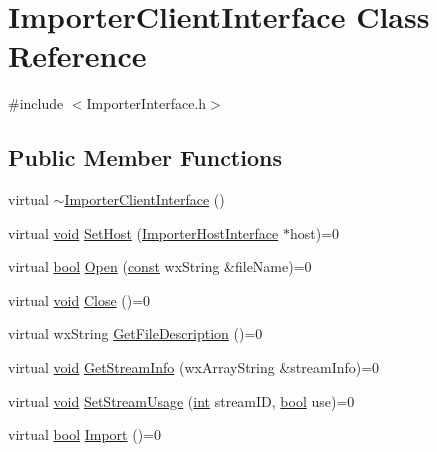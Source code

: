 \hypertarget{class_importer_client_interface}{}\section{Importer\+Client\+Interface Class Reference}
\label{class_importer_client_interface}


{\ttfamily \#include $<$Importer\+Interface.\+h$>$}

\subsection*{Public Member Functions}
\begin{DoxyCompactItemize}
\item 
virtual \hyperlink{class_importer_client_interface_a510b94f47f6985c863af461fdb2a478d}{$\sim$\+Importer\+Client\+Interface} ()
\item 
virtual \hyperlink{sound_8c_ae35f5844602719cf66324f4de2a658b3}{void} \hyperlink{class_importer_client_interface_a926f9f6bd2c612afaf70bbd5dcd31bd6}{Set\+Host} (\hyperlink{class_importer_host_interface}{Importer\+Host\+Interface} $\ast$host)=0
\item 
virtual \hyperlink{mac_2config_2i386_2lib-src_2libsoxr_2soxr-config_8h_abb452686968e48b67397da5f97445f5b}{bool} \hyperlink{class_importer_client_interface_aca9fb9ad5d47d8dad93109f2088c6034}{Open} (\hyperlink{getopt1_8c_a2c212835823e3c54a8ab6d95c652660e}{const} wx\+String \&file\+Name)=0
\item 
virtual \hyperlink{sound_8c_ae35f5844602719cf66324f4de2a658b3}{void} \hyperlink{class_importer_client_interface_a952a542b51e328703ddca95e1e076df2}{Close} ()=0
\item 
virtual wx\+String \hyperlink{class_importer_client_interface_af2a0a1ff9f2a0fc624323196ad502cfd}{Get\+File\+Description} ()=0
\item 
virtual \hyperlink{sound_8c_ae35f5844602719cf66324f4de2a658b3}{void} \hyperlink{class_importer_client_interface_a26193328fb5b7756732e31770e1b81cb}{Get\+Stream\+Info} (wx\+Array\+String \&stream\+Info)=0
\item 
virtual \hyperlink{sound_8c_ae35f5844602719cf66324f4de2a658b3}{void} \hyperlink{class_importer_client_interface_aadbdc78bbce15384558fc237745d5558}{Set\+Stream\+Usage} (\hyperlink{xmltok_8h_a5a0d4a5641ce434f1d23533f2b2e6653}{int} stream\+ID, \hyperlink{mac_2config_2i386_2lib-src_2libsoxr_2soxr-config_8h_abb452686968e48b67397da5f97445f5b}{bool} use)=0
\item 
virtual \hyperlink{mac_2config_2i386_2lib-src_2libsoxr_2soxr-config_8h_abb452686968e48b67397da5f97445f5b}{bool} \hyperlink{class_importer_client_interface_a4ad8bae966867b3b1652209a315c7df6}{Import} ()=0
\end{DoxyCompactItemize}


